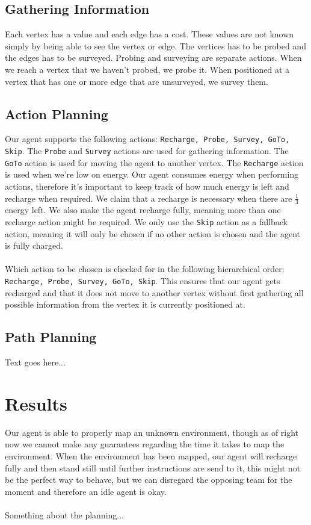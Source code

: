 \documentclass[11pt]{report}
\begin{document}
\subsection*{Gathering Information}
Each vertex has a value and each edge has a cost. These values are not known simply  by being able to see the vertex or edge. The vertices has to be probed and the edges has to be surveyed. Probing and surveying are separate actions. When we reach a vertex that we haven't probed, we probe it. When positioned at a vertex that has one or more edge that are unsurveyed, we survey them.

\subsection*{Action Planning}
Our agent supports the following actions: {\tt Recharge, Probe, Survey, GoTo, Skip}. The {\tt Probe} and {\tt Survey} actions are used for gathering information. The {\tt GoTo} action is used for moving the agent to another vertex. The {\tt Recharge} action is used when we're low on energy. Our agent consumes energy when performing actions, therefore it's important to keep track of how much energy is left and recharge when required. We claim that a recharge is necessary when there are $\frac{1}{3}$ energy left. We also make the agent recharge fully, meaning more than one recharge action might be required. We only use the {\tt Skip} action as a fallback action, meaning it will only be chosen if no other action is chosen and the agent is fully charged.\\
\\
Which action to be chosen is checked for in the following hierarchical order: {\tt Recharge, Probe, Survey, GoTo, Skip}. This ensures that our agent gets recharged and that it does not move to another vertex without first gathering all possible information from the vertex it is currently positioned at.

\subsection*{Path Planning}
Text goes here...

\section*{Results}
Our agent is able to properly map an unknown environment, though as of right now we cannot make any guarantees regarding the time it takes to map the environment. When the environment has been mapped, our agent will recharge fully and then stand still until further instructions are send to it, this might not be the perfect way to behave, but we can disregard the opposing team for the moment and therefore an idle agent is okay.\\
\\
Something about the planning...
\end{document}

